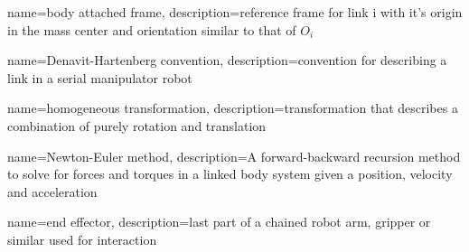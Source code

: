 \makeglossaries
 
 
{
    name={body attached frame},
    description={reference frame for link i with it's origin in the mass center and orientation similar to that of $O_i$}
}

{
    name={Denavit-Hartenberg convention},
    description={convention for describing a link in a serial manipulator robot}
}

{
    name={homogeneous transformation},
    description={transformation that describes a combination of purely rotation and translation}
}


{
    name={Newton-Euler method},
    description={A forward-backward recursion method to solve for forces and torques in a linked body system given a position, velocity and acceleration}
}

{
    name={end effector},
    description={last part of a chained robot arm, gripper or similar used for interaction}
}
